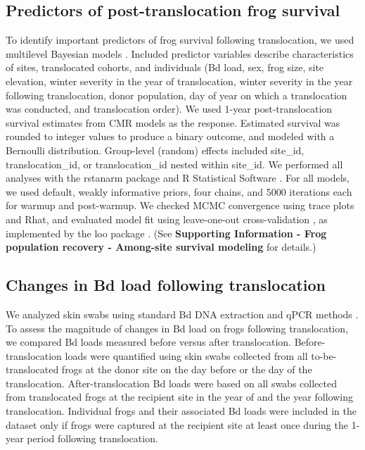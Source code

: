 \documentclass[9pt,twocolumn,twoside,lineno]{pnas-new}
\begin{document}
{\hypertarget{predictors-of-post-translocation-frog-survival}{%
\subsection*{Predictors of post-translocation frog
survival}\label{predictors-of-post-translocation-frog-survival}}

To identify important predictors of frog survival following
translocation, we used multilevel Bayesian models
\citep{gelman2013, gabry2019}. Included predictor variables describe
characteristics of sites, translocated cohorts, and individuals (Bd
load, sex, frog size, site elevation, winter severity in the year of
translocation, winter severity in the year following translocation,
donor population, day of year on which a translocation was conducted,
and translocation order). We used 1-year post-translocation survival
estimates from CMR models as the response. Estimated survival was
rounded to integer values to produce a binary outcome, and modeled with
a Bernoulli distribution. Group-level (random) effects included
site\_id, translocation\_id, or translocation\_id nested within
site\_id. We performed all analyses with the rstanarm package
\citep{rstanarm2022} and R Statistical Software
\citep[v4.4.4,][]{rsoftware2022}. For all models, we used default,
weakly informative priors, four chains, and 5000 iterations each for
warmup and post-warmup. We checked MCMC convergence using trace plots
and Rhat, and evaluated model fit using leave-one-out cross-validation
\citep{vehtari2016}, as implemented by the loo package
\citep{vehtari2022}. (See \textbf{Supporting Information - Frog
population recovery - Among-site survival modeling} for details.)

\hypertarget{changes-in-bd-load-following-translocation}{%
\subsection*{Changes in Bd load following
translocation}\label{changes-in-bd-load-following-translocation}}

We analyzed skin swabs using standard Bd DNA extraction and qPCR methods
\citep[see \textbf{Supporting Information - Frog population recovery -
Laboratory methods} for details]{boyle2004}. To assess the magnitude of
changes in Bd load on frogs following translocation, we compared Bd
loads measured before versus after translocation. Before-translocation
loads were quantified using skin swabs collected from all
to-be-translocated frogs at the donor site on the day before or the day
of the translocation. After-translocation Bd loads were based on all
swabs collected from translocated frogs at the recipient site in the
year of and the year following translocation. Individual frogs and their
associated Bd loads were included in the dataset only if frogs were
captured at the recipient site at least once during the 1-year period
following translocation.

}
\end{document}
